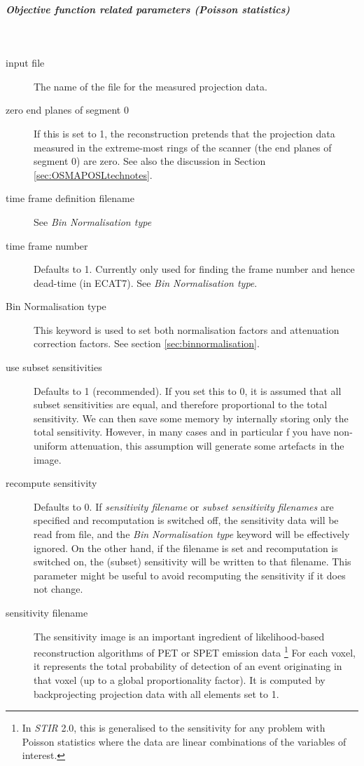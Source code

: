 \documentclass{article}
\newcommand{\subsubsubsubsection}[1]{\subparagraph{#1} \mbox{} \\}
\begin{document}
{ \subsubsubsubsection{Objective function related parameters (Poisson statistics)}
}
\label{sec:PoissonProjectionDataObjectiveFunction}

\begin{description}

\item[input file]
The name of the file for the measured projection data. 


\item[zero end planes of segment 0]
If this is set to 1, the reconstruction pretends that the projection 
data measured in the extreme-most rings of the scanner (the end 
planes of segment 0) are zero. See also the discussion in Section 
\ref{sec:OSMAPOSLtechnotes}.


\item[time frame definition filename]
See \textit{Bin Normalisation type}

\item[time frame number]
Defaults to 1. Currently only used for finding the frame number and hence dead-time (in ECAT7).
See \textit{Bin Normalisation type}.

\item[Bin Normalisation type]
This keyword is used to set both normalisation factors and attenuation
correction factors. See section \ref{sec:binnormalisation}.

\item[use subset sensitivities]
Defaults to 1 (recommended).
If you set this to 0, it is assumed that all subset sensitivities are equal, and therefore proportional 
to the total sensitivity. We can then save some memory by internally storing only the total sensitivity. 
However, in many cases and in particular f you have non-uniform attenuation, 
this assumption will generate some artefacts in the image.

\item[recompute sensitivity]
Defaults to 0. If \textit{sensitivity filename} or \textit{subset sensitivity filenames} 
are specified and recomputation is switched off, the sensitivity data will be read
from file, and the 
\textit{Bin Normalisation type} keyword will be effectively ignored.
On the other hand, if the filename is set and recomputation is switched on, the
(subset) sensitivity will be written to that filename. This parameter might be useful
to avoid recomputing the sensitivity if it does not change.

\item[sensitivity filename]
The sensitivity image is an important ingredient of 
likelihood-based reconstruction algorithms of PET or SPET emission data
\footnote{In \textit{STIR} 2.0, this is generalised to the sensitivity for
any problem with Poisson statistics where the data are linear
combinations of the variables of interest.}
For each voxel, it represents the total probability of detection of an 
event originating in that voxel (up to a global proportionality factor).
It is computed by backprojecting projection data with all elements set to 1.


\end{description}
\end{document}
